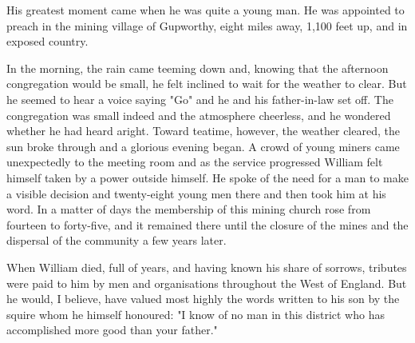His greatest moment came when he was quite a young man. He was appointed to preach in the mining village of Gupworthy, eight miles away, 1,100 feet up, and in exposed country.

In the morning, the rain came teeming down and, knowing that the afternoon congregation would be small, he felt inclined to wait for the weather to clear. But he seemed to hear a voice saying "Go" and he and his father-in-law set off. The congregation was small indeed and the atmosphere cheerless, and he wondered whether he had heard aright. Toward teatime, however, the weather cleared, the sun broke through and a glorious evening began. A crowd of young miners came unexpectedly to the meeting room and as the service progressed William felt himself taken by a power outside himself. He spoke of the need for a man to make a visible decision and twenty-eight young men there and then took him at his word. In a matter of days the membership of this mining church rose from fourteen to forty-five, and it remained there until the closure of the mines and the dispersal of the community a few years later.

When William died, full of years, and having known his share of sorrows, tributes were paid to him by men and organisations throughout the West of England. But he would, I believe, have valued most highly the words written to his son by the squire whom he himself honoured: "I know of no man in this district who has accomplished more good than your father."
